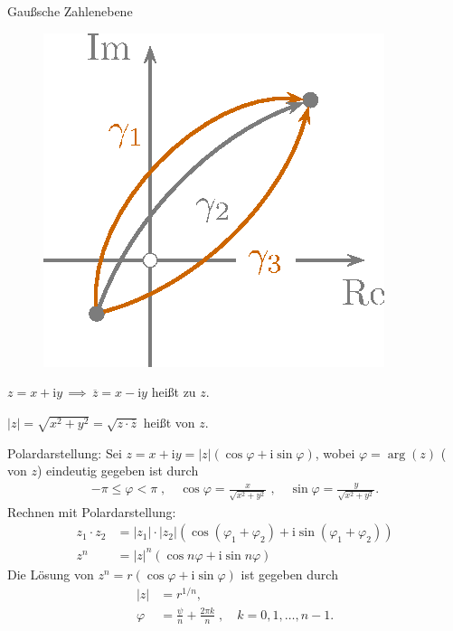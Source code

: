 \documentclass[a4paper,10pt]{scrbook}
\begin{document}
\begin{notice}
  \item Gaußsche Zahlenebene

  \begin{figure}[H]
    \centering
    \includegraphics[scale=0.2]{images/ana3-tmp-1}
  \end{figure}
\end{notice}

\begin{theorem}[Definition]
  \begin{enum-arab}
    \item $z = x + \mathrm{i} y \, \implies \, \overline{z} = x - \mathrm{i} y$ heißt  zu $z$.

    \item $|z| = \sqrt{x^2 + y^2} = \sqrt{z \cdot \overline{z}}$ heißt  von $z$.

    \item Polardarstellung: Sei $z = x + \mathrm{i} y = |z| (\cos \varphi + \mathrm{i} \sin \varphi)$, wobei $\varphi = \arg(z)$ ( von $z$) eindeutig gegeben ist durch
    \begin{align*}
      - \pi \leq \varphi < \pi \; , \quad \cos \varphi = \frac{x}{\sqrt{x^2 + y^2}} \; , \quad \sin \varphi = \frac{y}{\sqrt{x^2 + y^2}}.
    \end{align*}
    Rechnen mit Polardarstellung:
    \begin{align*}
      z_1 \cdot z_2 &= |z_1| \cdot |z_2| ( \cos(\varphi_1 + \varphi_2) + \mathrm{i} \sin(\varphi_1 + \varphi_2) ) \\
      z^n &= |z|^n (\cos n \varphi + \mathrm{i} \sin n \varphi)
    \end{align*}
    Die Lösung von $z^n = r (\cos \varphi + \mathrm{i} \sin \varphi)$ ist gegeben durch
    \begin{align*}
      |z| &= r^{1/n}, \\
      \varphi &= \frac{\psi}{n} + \frac{2 \pi k}{n} \; , \quad k = 0,1,\ldots,n-1.
    \end{align*}
  \end{enum-arab}
\end{theorem}
\end{document}
